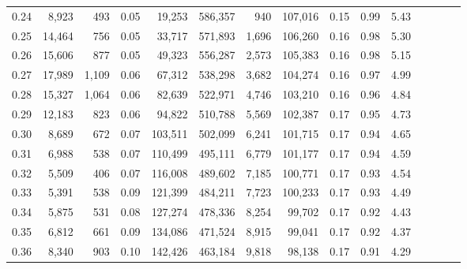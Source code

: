 \begin{tabular}{rrrcrrrrrrrrrrr}
0.24 &   8,923 &    493 &                                       0.05 &   19,253 &  586,357 &      940 &  107,016 &  0.15 &  0.99 &                         5.43 \\
0.25 &  14,464 &    756 &                                       0.05 &   33,717 &  571,893 &    1,696 &  106,260 &  0.16 &  0.98 &                         5.30 \\
0.26 &  15,606 &    877 &                                       0.05 &   49,323 &  556,287 &    2,573 &  105,383 &  0.16 &  0.98 &                         5.15 \\
0.27 &  17,989 &  1,109 &                                       0.06 &   67,312 &  538,298 &    3,682 &  104,274 &  0.16 &  0.97 &                         4.99 \\
0.28 &  15,327 &  1,064 &                                       0.06 &   82,639 &  522,971 &    4,746 &  103,210 &  0.16 &  0.96 &                         4.84 \\
0.29 &  12,183 &    823 &                                       0.06 &   94,822 &  510,788 &    5,569 &  102,387 &  0.17 &  0.95 &                         4.73 \\
0.30 &   8,689 &    672 &                                       0.07 &  103,511 &  502,099 &    6,241 &  101,715 &  0.17 &  0.94 &                         4.65 \\
0.31 &   6,988 &    538 &                                       0.07 &  110,499 &  495,111 &    6,779 &  101,177 &  0.17 &  0.94 &                         4.59 \\
0.32 &   5,509 &    406 &                                       0.07 &  116,008 &  489,602 &    7,185 &  100,771 &  0.17 &  0.93 &                         4.54 \\
0.33 &   5,391 &    538 &                                       0.09 &  121,399 &  484,211 &    7,723 &  100,233 &  0.17 &  0.93 &                         4.49 \\
0.34 &   5,875 &    531 &                                       0.08 &  127,274 &  478,336 &    8,254 &   99,702 &  0.17 &  0.92 &                         4.43 \\
0.35 &   6,812 &    661 &                                       0.09 &  134,086 &  471,524 &    8,915 &   99,041 &  0.17 &  0.92 &                         4.37 \\
0.36 &   8,340 &    903 &                                       0.10 &  142,426 &  463,184 &    9,818 &   98,138 &  0.17 &  0.91 &                         4.29 \\

\end{tabular}
